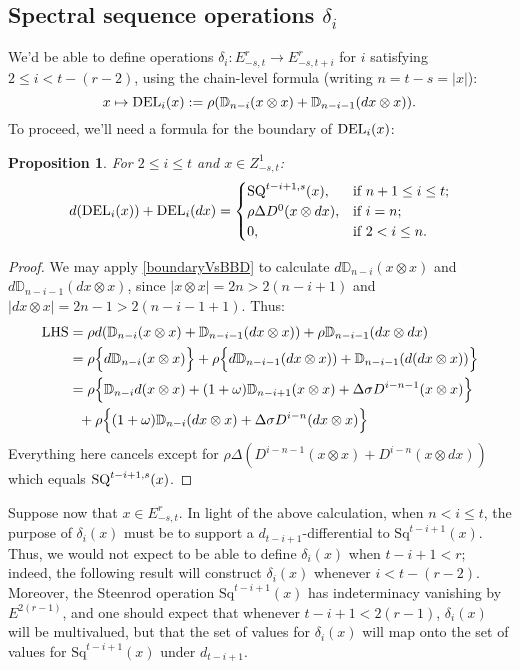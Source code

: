 \documentclass[11pt]{amsart}
\theoremstyle{plain}
\newtheorem{prop}[thm]{Proposition}
\theoremstyle{definition}
\renewcommand{\to}{\longrightarrow}
\theoremstyle{plain}
\newcommand{\twist}{\omega}
\newcommand{\Sq}{\mathrm{Sq}}
\begin{document}
\begin{External spectral sequence operations}
\subsection{Spectral sequence operations $\delta_i$}
We'd be able to define operations $\delta_i:E^r_{-s,t}\to E^r_{-s,t+i}$ for $i$ satisfying $2\leq i<t-(r-2)$, using the chain-level formula (writing $n=t-s=|x|$):
\[x\mapsto \textup{DEL}_{i}(x):=\rho(\mathbb{D}_{n-i}(x\otimes x)+\mathbb{D}_{n-i-1}(dx\otimes x)).\]
To proceed, we'll need a formula for the boundary of $\textup{DEL}_i(x)$:
\begin{prop}
\label{dvsDEL}
For $2\leq i\leq t$ and $x\in Z^1_{-s,t}$:
\[d(\textup{DEL}_i(x))+ \textup{DEL}_i(dx)=\begin{cases}
\textup{SQ}^{t-i+1,s}(x),&\textup{if }n+1\leq i \leq t;\\
\rho\Delta D^0(x\otimes dx),&\textup{if }i=n;\\
0,&\textup{if }2< i\leq n.
\end{cases}\]
\end{prop}
\begin{proof}
We may apply \ref{boundaryVsBBD} to calculate $d\mathbb{D}_{n-i}(x\otimes x)$ and $d\mathbb{D}_{n-i-1}(dx\otimes x)$, since $|x\otimes x|=2n> 2(n-i+1)$ and $|dx\otimes x|=2n-1> 2(n-i-1+1)$. Thus:
\begin{alignat*}{2}
\textup{LHS}
&=
\rho d(\mathbb{D}_{n-i}(x\otimes x)+\mathbb{D}_{n-i-1}(dx\otimes x))+\rho\mathbb{D}_{n-i-1}(dx\otimes dx)%
\\
&=
\rho\Bigl\{d\mathbb{D}_{n-i}(x\otimes x)\Bigr\}+\rho\Bigl\{d\mathbb{D}_{n-i-1}(dx\otimes x))+\mathbb{D}_{n-i-1}(d(dx\otimes x))\Bigr\}%
\\
&=
\rho\Bigl\{\mathbb{D}_{n-i}d(x\otimes x)+(1+\twist)\mathbb{D}_{n-i+1}(x\otimes x)+\Delta\sigma D^{i-n-1}(x\otimes x)\Bigr\}
\\
&\ \ +\rho\Bigl\{(1+\twist)\mathbb{D}_{n-i}(dx\otimes x)+\Delta\sigma D^{i-n}(dx\otimes x)\Bigr\}
\end{alignat*}
Everything here cancels except for $\rho\Delta(D^{i-n-1}(x\otimes x)+D^{i-n}(x\otimes dx))$ which equals $\textup{SQ}^{t-i+1,s}(x)$.
\end{proof}
Suppose now that $x\in E^r_{-s,t}$. In light of the above calculation, when $n<i\leq t$, the purpose of $\delta_i(x)$ must be to support a $d_{t-i+1}$-differential to $\Sq^{t-i+1}(x)$. Thus, we would not expect to be able to define $\delta_i(x)$ when $t-i+1<r$; indeed, the following result will construct $\delta_i(x)$ whenever $i<t-(r-2)$. Moreover, the Steenrod operation $\Sq^{t-i+1}(x)$ has indeterminacy vanishing by $E^{2(r-1)}$, and one should expect that whenever $t-i+1<2(r-1)$, $\delta_i(x)$ will be multivalued, but that the set of values for $\delta_i(x)$ will map onto the set of values for $\Sq^{t-i+1}(x)$ under $d_{t-i+1}$.%

\end{External spectral sequence operations}
\end{document}
